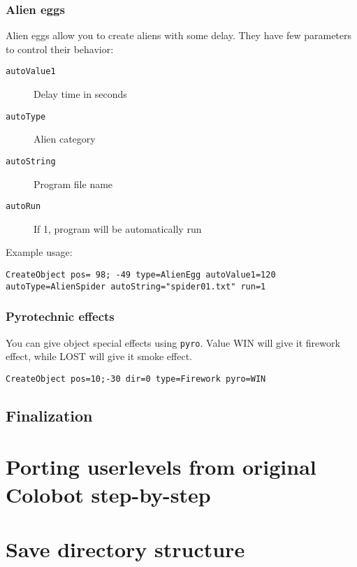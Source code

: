 \subsection{Alien eggs}

Alien eggs allow you to create aliens with some delay. They have few parameters to control their behavior:

\begin{description}
    \item[\texttt{autoValue1}] Delay time in seconds
    \item[\texttt{autoType}] Alien category
    \item[\texttt{autoString}] Program file name
    \item[\texttt{autoRun}] If 1, program will be automatically run
\end{description}

Example usage:

\begin{verbatim}
CreateObject pos= 98; -49 type=AlienEgg autoValue1=120 autoType=AlienSpider autoString="spider01.txt" run=1
\end{verbatim}


\subsection{Pyrotechnic effects}

You can give object special effects using \texttt{pyro}. Value WIN will give it firework effect, while LOST will give it smoke effect.

\begin{verbatim}
CreateObject pos=10;-30 dir=0 type=Firework pyro=WIN
\end{verbatim}


\section{Finalization}


\chapter{Porting userlevels from original Colobot step-by-step}


\chapter{Save directory structure}




